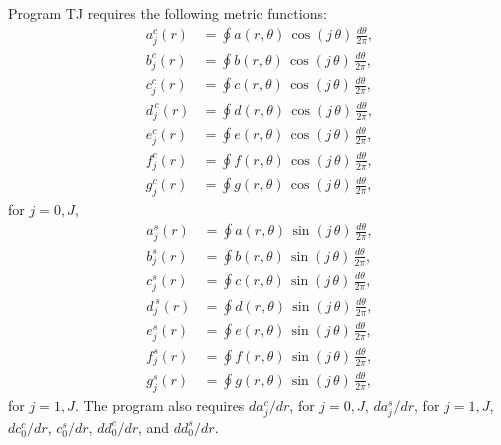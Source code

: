 \documentclass[notitlepage,12pt]{article}
\begin{document}
Program TJ requires the following metric functions:
\begin{align}
a^c_j(r) &= \oint a(r,\theta)\,\cos(j\,\theta)\,\frac{d\theta}{2\pi},\\[0.5ex]
b^c_j(r) &= \oint b(r,\theta)\,\cos(j\,\theta)\,\frac{d\theta}{2\pi},\\[0.5ex]
c^c_j(r) &= \oint c(r,\theta)\,\cos(j\,\theta)\,\frac{d\theta}{2\pi},\\[0.5ex]
d^{\,c}_j(r)&=  \oint d(r,\theta)\,\cos(j\,\theta)\,\frac{d\theta}{2\pi},\\[0.5ex]
e^c_j(r) &= \oint e(r,\theta)\,\cos(j\,\theta)\,\frac{d\theta}{2\pi},\\[0.5ex]
f^c_j(r) &=  \oint f(r,\theta)\,\cos(j\,\theta)\,\frac{d\theta}{2\pi},\\[0.5ex]
g^c_j(r)&= \oint g(r,\theta)\,\cos(j\,\theta)\,\frac{d\theta}{2\pi},
\end{align}
for $j=0,J$,
\begin{align}
a^s_j(r) &= \oint a(r,\theta)\,\sin(j\,\theta)\,\frac{d\theta}{2\pi},\\[0.5ex]
b^s_j(r) &= \oint b(r,\theta)\,\sin(j\,\theta)\,\frac{d\theta}{2\pi},\\[0.5ex]
c^s_j(r) &= \oint c(r,\theta)\,\sin(j\,\theta)\,\frac{d\theta}{2\pi},\\[0.5ex]
d^{\,s}_j(r)&=  \oint d(r,\theta)\,\sin(j\,\theta)\,\frac{d\theta}{2\pi},\\[0.5ex]
e^s_j(r) &= \oint e(r,\theta)\,\sin(j\,\theta)\,\frac{d\theta}{2\pi},\\[0.5ex]
f^s_j(r) &=  \oint f(r,\theta)\,\sin(j\,\theta)\,\frac{d\theta}{2\pi},\\[0.5ex]
g^s_j(r)&= \oint g(r,\theta)\,\sin(j\,\theta)\,\frac{d\theta}{2\pi},
\end{align}
for $j=1,J$. 
The program also requires $da^c_j/dr$, for $j=0,J$, $da^s_j/dr$, for $j=1,J$, $dc_0^c/dr$, $c_0^s/dr$, $d d_0^c/dr$, and $dd_0^s/dr$. 
\end{document}
